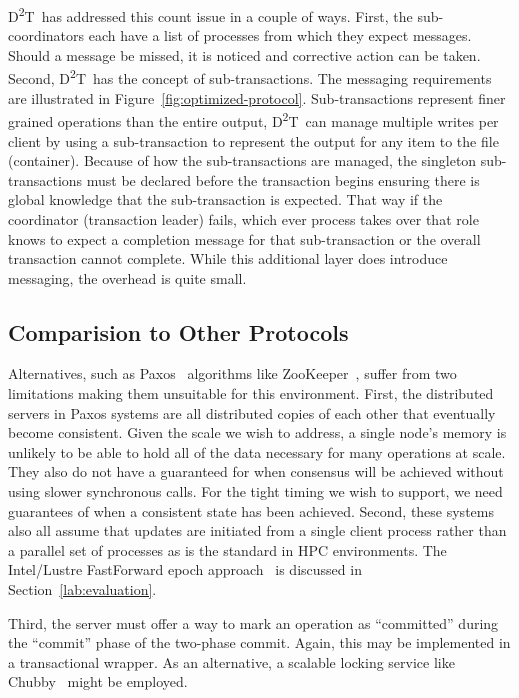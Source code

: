 \documentclass[conference]{sig-alt-gov2}
\newcommand{\DDT}{D\textsuperscript{2}T~}
\begin{document}
\DDT has addressed this count issue in a couple of ways. First, the
sub-coordinators each have a list of processes from which they expect messages.
Should a message be missed, it is noticed and corrective action can be taken.
Second, \DDT has the concept of sub-transactions. The messaging requirements
are illustrated in Figure~\ref{fig:optimized-protocol}.  Sub-transactions
represent finer grained operations than the entire output, \DDT can manage
multiple writes per client by using a sub-transaction to represent the output
for any item to the file (container). Because of how the sub-transactions are
managed, the singleton sub-transactions must be declared before the transaction
begins ensuring there is global knowledge that the sub-transaction is expected.
That way if the coordinator (transaction leader) fails, which ever process
takes over that role knows to expect a completion message for that
sub-transaction or the overall transaction cannot complete. While this
additional layer does introduce messaging, the overhead is quite small.

\subsection{Comparision to Other Protocols}
Alternatives, such as Paxos~\cite{Lamport:1998:paxos} algorithms like
ZooKeeper~\cite{Hunt:2010:zookeeper}, suffer from two limitations making them
unsuitable for this environment. First, the distributed servers in Paxos
systems are all distributed copies of each other that eventually become
consistent. Given the scale we wish to address, a single node's memory is
unlikely to be able to hold all of the data necessary for many operations at
scale. They also do not have a guaranteed for when consensus will be
achieved without using slower synchronous calls. For the tight timing we wish
to support, we need guarantees of when a consistent state has been achieved.
Second, these systems also all assume that updates are initiated from a single
client process rather than a parallel set of processes as is the standard in
HPC environments. The Intel/Lustre FastForward epoch
approach~\cite{barton:2013:fastforward,lombardi:2013:epochs} is discussed in
Section~\ref{lab:evaluation}.

Third, the server must offer a way to mark an operation as ``committed'' during
the ``commit'' phase of the two-phase commit.  Again, this may be implemented
in a transactional wrapper.  As an alternative, a scalable locking service like
Chubby~\cite{burrows:2006:chubby} might be employed.
\end{document}
